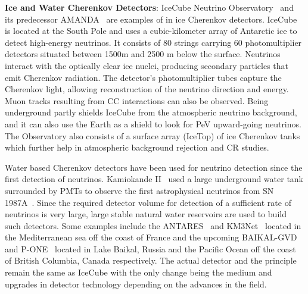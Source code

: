 \begin{description}
  \item \textbf{Ice and Water Cherenkov Detectors}: IceCube Neutrino Observatory~\cite{Aartsen_2017} and its predecessor AMANDA~\cite{WISCHNEWSKI1999412} are examples of in ice Cherenkov detectors. IceCube is located at the South Pole and uses a cubic-kilometer array of Antarctic ice to detect high-energy neutrinos. It consists of 80 strings carrying 60 photomultiplier detectors situated between 1500m and 2500 m below the surface. Neutrinos interact with the optically clear ice nuclei, producing secondary particles that emit Cherenkov radiation. The detector's photomultiplier tubes capture the Cherenkov light, allowing reconstruction of the neutrino direction and energy. Muon tracks resulting from CC interactions can also be observed. Being underground partly shields IceCube from the atmospheric neutrino background, and it can also use the Earth as a shield to look for PeV upward-going neutrinos. The Observatory also consists of a surface array (IceTop) of ice Cherenkov tanks which further help in atmospheric background rejection and CR studies. 
  
  Water based Cherenkov detectors have been used for neutrino detection since the first detection of neutrinos. Kamiokande II~\cite{Arisaka:1984aoa} used a large underground water tank surrounded by PMTs to observe the first astrophysical neutrinos from SN 1987A~\cite{PhysRevLett.58.1490}. Since the required detector volume for detection of a sufficient rate of neutrinos is very large, large stable natural water reservoirs are used to build such detectors. Some examples include the ANTARES~\cite{CREUSOT2013489} and KM3Net~\cite{MARGIOTTA201483} located in the Mediterranean sea off the coast of France and the upcoming BAIKAL-GVD~\cite{MALYSHKIN2023168117} and P-ONE~\cite{P-ONE:2020ljt} located in Lake Baikal, Russia and the Pacific Ocean off the coast of British Columbia, Canada respectively. The actual detector and the principle remain the same as IceCube with the only change being the medium and upgrades in detector technology depending on the advances in the field. 
  

\end{description}
